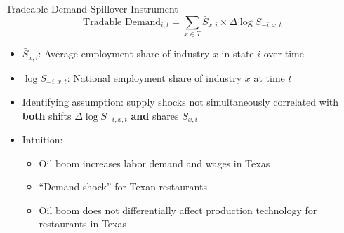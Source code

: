 \documentclass[english,xcolor=svgnames]{beamer}
\begin{document}
\begin{frame}{Tradeable Demand Spillover Instrument} \label{IV}
		\[\text{Tradable Demand}_{i,t} = \sum_{x \in T} \bar{S}_{x,i} \times \Delta \log{S}_{-i,x,t}\] \vspace{-12pt} 
		
\begin{itemize}
	\itemsep0.5em
	\item $\bar{S}_{x,i}$: Average employment share of industry $x$ in state $i$ over time \vspace{-0.5em}			
	\item $\log S_{-i,x,t}$: National employment share of industry $x$ at time $t$
\end{itemize}	
	
\begin{itemize}
	\item Identifying assumption: supply shocks not simultaneously correlated with \textbf{both} shifts $ \Delta \log S_{-i,x,t}$ \textbf{and} shares $\bar{S}_{x,i}$ 
	\item Intuition:
		\begin{itemize}
			\item Oil boom increases labor demand and wages in Texas
			\item ``Demand shock'' for Texan restaurants
			\item Oil boom does not differentially affect production technology for restaurants in Texas
		\end{itemize}		
\end{itemize}			
\end{frame}
\end{document}
